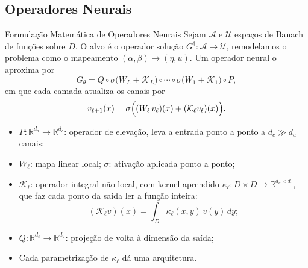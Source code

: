 \subsection{Operadores Neurais}

\begin{frame}{Formulação Matemática de Operadores Neurais}
  \setlength{\abovedisplayskip}{4pt}\setlength{\belowdisplayskip}{4pt}%
  Sejam $\mathcal{A}$ e $\mathcal{U}$ espaços de Banach de funções sobre $D$. O alvo é o
  operador solução $G^\dagger : \mathcal{A} \to \mathcal{U}$, remodelamos o problema como o mapeamento $(\alpha, \beta) \mapsto (\eta, u)$. Um operador neural o aproxima por
  \begin{equation*}
    G_\theta = Q \circ \sigma\bigl(W_L + \mathcal{K}_L\bigr) \circ \cdots \circ
               \sigma\bigl(W_1 + \mathcal{K}_1\bigr) \circ P ,
  \end{equation*}
  em que cada camada atualiza os canais por
  \begin{equation*}
    v_{\ell+1}(x) = \sigma\Bigl((W_\ell\,v_\ell)(x) + (\mathcal{K}_\ell v_\ell)(x)\Bigr).
  \end{equation*}
  \begin{itemize}[<+->]
    \item $P : \mathbb{R}^{d_a} \to \mathbb{R}^{d_c}$: operador de elevação, leva a
          entrada ponto a ponto a $d_c \gg d_a$ canais;
    \item $W_\ell$: mapa linear local; $\sigma$: ativação aplicada ponto a ponto;
    \item $\mathcal{K}_\ell$: operador integral não local, com kernel aprendido
          $\kappa_\ell : D \times D \to \mathbb{R}^{d_c \times d_c}$, que faz cada ponto
          da saída ler a função inteira:
          \[
            (\mathcal{K}_\ell v)(x) = \int_D \kappa_\ell(x,y)\,v(y)\,dy ;
          \]
    \item $Q : \mathbb{R}^{d_c} \to \mathbb{R}^{d_u}$: projeção de volta à dimensão da
          saída;
    \item Cada parametrização de $\kappa_\ell$ dá uma arquitetura.
  \end{itemize}
\end{frame}

